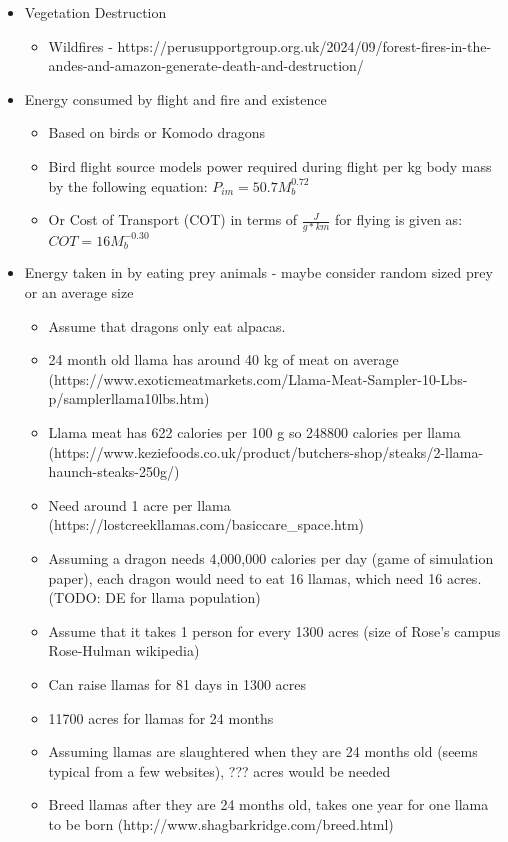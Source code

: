 \documentclass{article}
\begin{document}
\begin{itemize}
\begin{itemize}
\end{itemize} 
\item Vegetation Destruction
\begin{itemize}
    \item Wildfires - https://perusupportgroup.org.uk/2024/09/forest-fires-in-the-andes-and-amazon-generate-death-and-destruction/
\end{itemize}
\item Energy consumed by flight and fire and existence
\begin{itemize}
    \item Based on birds or Komodo dragons
    \item Bird flight source models power required during flight per kg body mass by the following equation: $P_{im}=50.7M^{0.72}_b$
    \item Or Cost of Transport (COT) in terms of $\frac{J}{g*km}$ for flying is given as: $COT=16M_b^{-0.30}$
\end{itemize}
\item Energy taken in by eating prey animals - maybe consider random sized prey or an average size
\begin{itemize}
    \item Assume that dragons only eat alpacas.
    \item 24 month old llama has around 40 kg of meat on average (https://www.exoticmeatmarkets.com/Llama-Meat-Sampler-10-Lbs-p/samplerllama10lbs.htm)
    \item Llama meat has 622 calories per 100 g so 248800 calories per llama (https://www.keziefoods.co.uk/product/butchers-shop/steaks/2-llama-haunch-steaks-250g/)
    \item Need around 1 acre per llama (https://lostcreekllamas.com/basiccare\_space.htm)
    \item Assuming a dragon needs 4,000,000 calories per day (game of simulation paper), each dragon would need to eat 16 llamas, which need 16 acres. (TODO: DE for llama population)
    \item Assume that it takes 1 person for every 1300 acres (size of Rose's campus Rose-Hulman wikipedia)
    \item Can raise llamas for 81 days in 1300 acres
    \item 11700 acres for llamas for 24 months
    \item Assuming llamas are slaughtered when they are 24 months old (seems typical from a few websites), ??? acres would be needed
    \item Breed llamas after they are 24 months old, takes one year for one llama to be born (http://www.shagbarkridge.com/breed.html)

\end{itemize}
\end{itemize}
\end{document}
